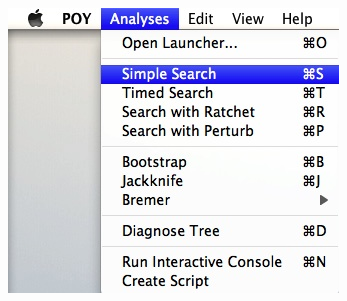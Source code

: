 \begin{figure}
\centering
\begin{minipage}[c]{0.45\textwidth}
   		\includegraphics[width=\textwidth]{doc/figures/simplesearch_menu.jpg}
\end{minipage}
\,
\begin{minipage}[c]{0.52\textwidth}

\end{minipage}
\end{figure}
